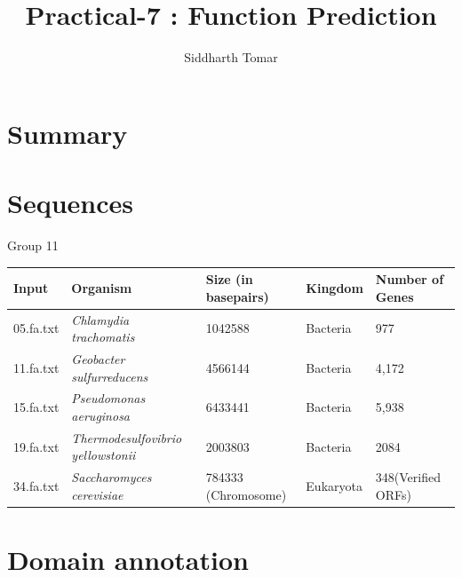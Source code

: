 \documentclass[a4paper,10pt]{article}
\title{Practical-7 : Function Prediction}
\author{Siddharth Tomar}
\begin{document}
\maketitle

\section*{Summary}


\section*{Sequences}
Group 11\\
\begin{table}[h]
\centering
\label{my-label}
\begin{tabular}{lllll}
Input                          & Organism                                                       & Size (in basepairs)                      & Kingdom                        & Number of Genes    \\ \hline
\multicolumn{1}{l|}{05.fa.txt} & \multicolumn{1}{l|}{\textit{Chlamydia trachomatis}}            & \multicolumn{1}{l|}{1042588}             & \multicolumn{1}{l|}{Bacteria}  & 977                \\
\multicolumn{1}{l|}{11.fa.txt} & \multicolumn{1}{l|}{\textit{Geobacter sulfurreducens}}         & \multicolumn{1}{l|}{4566144}             & \multicolumn{1}{l|}{Bacteria}  & 4,172              \\
\multicolumn{1}{l|}{15.fa.txt} & \multicolumn{1}{l|}{\textit{Pseudomonas aeruginosa}}           & \multicolumn{1}{l|}{6433441}             & \multicolumn{1}{l|}{Bacteria}  & 5,938              \\
\multicolumn{1}{l|}{19.fa.txt} & \multicolumn{1}{l|}{\textit{Thermodesulfovibrio yellowstonii}} & \multicolumn{1}{l|}{2003803}             & \multicolumn{1}{l|}{Bacteria}  & 2084               \\
\multicolumn{1}{l|}{34.fa.txt} & \multicolumn{1}{l|}{\textit{Saccharomyces cerevisiae}}         & \multicolumn{1}{l|}{784333 (Chromosome)} & \multicolumn{1}{l|}{Eukaryota} & 348(Verified ORFs)
\end{tabular}
\end{table}
\medskip

\section*{Domain annotation}
\end{document}
